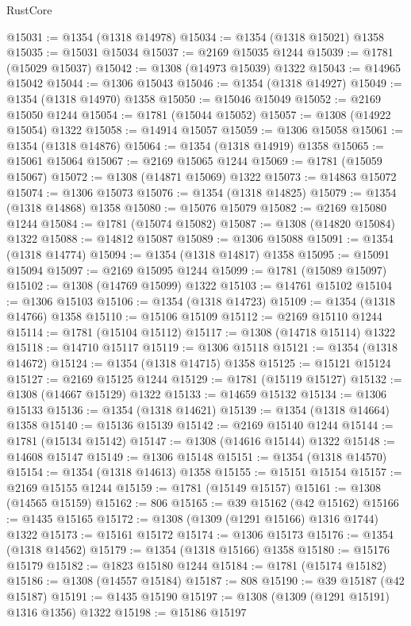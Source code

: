 \begin{lexlean}{RustCore}
\begin{coremodule}
@15031 := @1354 (@1318 @14978)
@15034 := @1354 (@1318 @15021) @1358
@15035 := @15031 @15034
@15037 := @2169 @15035 @1244
@15039 := @1781 (@15029 @15037)
@15042 := @1308 (@14973 @15039) @1322
@15043 := @14965 @15042
@15044 := @1306 @15043
@15046 := @1354 (@1318 @14927)
@15049 := @1354 (@1318 @14970) @1358
@15050 := @15046 @15049
@15052 := @2169 @15050 @1244
@15054 := @1781 (@15044 @15052)
@15057 := @1308 (@14922 @15054) @1322
@15058 := @14914 @15057
@15059 := @1306 @15058
@15061 := @1354 (@1318 @14876)
@15064 := @1354 (@1318 @14919) @1358
@15065 := @15061 @15064
@15067 := @2169 @15065 @1244
@15069 := @1781 (@15059 @15067)
@15072 := @1308 (@14871 @15069) @1322
@15073 := @14863 @15072
@15074 := @1306 @15073
@15076 := @1354 (@1318 @14825)
@15079 := @1354 (@1318 @14868) @1358
@15080 := @15076 @15079
@15082 := @2169 @15080 @1244
@15084 := @1781 (@15074 @15082)
@15087 := @1308 (@14820 @15084) @1322
@15088 := @14812 @15087
@15089 := @1306 @15088
@15091 := @1354 (@1318 @14774)
@15094 := @1354 (@1318 @14817) @1358
@15095 := @15091 @15094
@15097 := @2169 @15095 @1244
@15099 := @1781 (@15089 @15097)
@15102 := @1308 (@14769 @15099) @1322
@15103 := @14761 @15102
@15104 := @1306 @15103
@15106 := @1354 (@1318 @14723)
@15109 := @1354 (@1318 @14766) @1358
@15110 := @15106 @15109
@15112 := @2169 @15110 @1244
@15114 := @1781 (@15104 @15112)
@15117 := @1308 (@14718 @15114) @1322
@15118 := @14710 @15117
@15119 := @1306 @15118
@15121 := @1354 (@1318 @14672)
@15124 := @1354 (@1318 @14715) @1358
@15125 := @15121 @15124
@15127 := @2169 @15125 @1244
@15129 := @1781 (@15119 @15127)
@15132 := @1308 (@14667 @15129) @1322
@15133 := @14659 @15132
@15134 := @1306 @15133
@15136 := @1354 (@1318 @14621)
@15139 := @1354 (@1318 @14664) @1358
@15140 := @15136 @15139
@15142 := @2169 @15140 @1244
@15144 := @1781 (@15134 @15142)
@15147 := @1308 (@14616 @15144) @1322
@15148 := @14608 @15147
@15149 := @1306 @15148
@15151 := @1354 (@1318 @14570)
@15154 := @1354 (@1318 @14613) @1358
@15155 := @15151 @15154
@15157 := @2169 @15155 @1244
@15159 := @1781 (@15149 @15157)
@15161 := @1308 (@14565 @15159)
@15162 := 806
@15165 := @39 @15162 (@42 @15162)
@15166 := @1435 @15165
@15172 := @1308 (@1309 (@1291 @15166) @1316 @1744) @1322
@15173 := @15161 @15172
@15174 := @1306 @15173
@15176 := @1354 (@1318 @14562)
@15179 := @1354 (@1318 @15166) @1358
@15180 := @15176 @15179
@15182 := @1823 @15180 @1244
@15184 := @1781 (@15174 @15182)
@15186 := @1308 (@14557 @15184)
@15187 := 808
@15190 := @39 @15187 (@42 @15187)
@15191 := @1435 @15190
@15197 := @1308 (@1309 (@1291 @15191) @1316 @1356) @1322
@15198 := @15186 @15197

\end{coremodule}
\end{lexlean}
